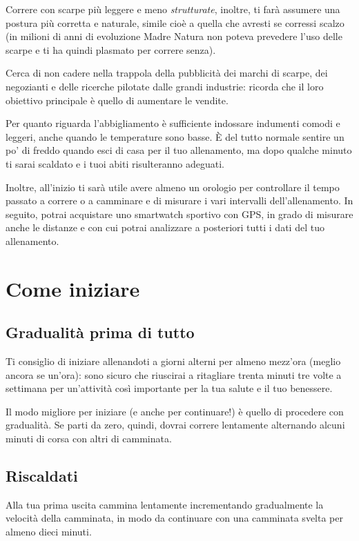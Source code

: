 Correre con scarpe più leggere e meno \emph{strutturate}, inoltre,
ti farà assumere una postura più corretta e naturale,
simile cioè a quella che avresti se corressi scalzo
(in milioni di anni di evoluzione Madre Natura non poteva prevedere
l’uso delle scarpe e ti ha quindi plasmato per correre senza).

Cerca di non cadere nella trappola della pubblicità dei marchi di scarpe,
dei negozianti e delle ricerche pilotate dalle grandi industrie:
ricorda che il loro obiettivo principale è quello di aumentare le vendite.

Per quanto riguarda l'abbigliamento è sufficiente indossare indumenti comodi e leggeri,
anche quando le temperature sono basse.
\`E del tutto normale sentire un po' di freddo quando esci di casa per il tuo allenamento,
ma dopo qualche minuto ti sarai scaldato e i tuoi abiti 
risulteranno adeguati.

Inoltre, all'inizio ti sarà utile avere almeno un orologio per
controllare il tempo passato a correre o a camminare
e di misurare i vari intervalli dell'allenamento.
In seguito, potrai acquistare uno smartwatch sportivo con GPS,
in grado di misurare anche le distanze e con cui potrai analizzare
a posteriori tutti i dati del tuo allenamento.


\chapter{Come iniziare}

\section{Gradualità prima di tutto}

Ti consiglio di iniziare allenandoti a giorni alterni
per almeno mezz'ora
(meglio ancora se un'ora):
sono sicuro che riuscirai a ritagliare trenta minuti
tre volte a settimana per un'attività così importante per la
tua salute e il tuo benessere.

Il modo migliore per iniziare (e anche per continuare!)
è quello di procedere con gradualità.
Se parti da zero, quindi, dovrai correre lentamente
alternando alcuni minuti di corsa con altri di camminata.

\section*{Riscaldati}
Alla tua prima uscita cammina lentamente incrementando
gradualmente la velocità della camminata, in modo da continuare con una 
camminata svelta per almeno dieci minuti.

